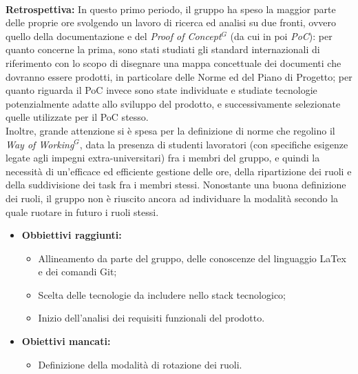 \paragraph{}
\textbf{Retrospettiva:}
In questo primo periodo, il gruppo ha speso la maggior parte delle proprie ore svolgendo un lavoro di ricerca ed analisi
su due fronti, ovvero quello della documentazione e del \emph{Proof of Concept}$^{G}$ (da cui in poi \emph{PoC}): per quanto concerne la prima, sono stati studiati gli standard internazionali di riferimento
con lo scopo di disegnare una mappa concettuale dei documenti che dovranno essere prodotti, in particolare delle Norme ed del Piano di Progetto; per quanto
riguarda il PoC invece sono state individuate e studiate tecnologie potenzialmente adatte allo sviluppo del prodotto, e successivamente selezionate quelle utilizzate per il PoC stesso. \\
Inoltre, grande attenzione si è spesa per la definizione di norme che regolino il \emph{Way of Working}$^{G}$, data la presenza di studenti lavoratori (con
specifiche esigenze legate agli impegni extra-universitari) fra i membri del gruppo, e quindi la necessità di un'efficace ed efficiente gestione delle ore, della ripartizione dei ruoli
e della suddivisione dei task fra i membri stessi. Nonostante una buona definizione dei ruoli, il gruppo non è riuscito ancora ad individuare la modalità secondo la quale
ruotare in futuro i ruoli stessi.
\begin{itemize}
    \item \textbf{Obbiettivi raggiunti:}
    \begin{itemize}
        \item Allineamento da parte del gruppo, delle conoscenze del linguaggio LaTex e dei comandi Git;
        \item Scelta delle tecnologie da includere nello stack tecnologico;
        \item Inizio dell'analisi dei requisiti funzionali del prodotto.
    \end{itemize}
    \item \textbf{Obiettivi mancati:}
    \begin{itemize}
        \item Definizione della modalità di rotazione dei ruoli.
    \end{itemize}
\end{itemize}